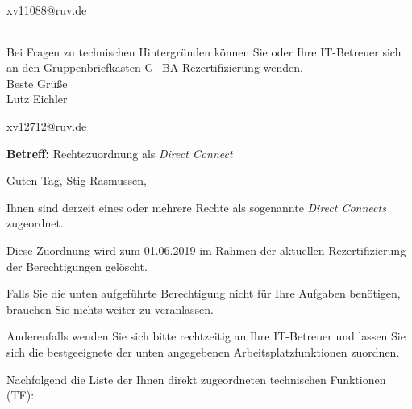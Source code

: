\documentclass[a4paper,landscape,12pt]{letter}
\begin{document}
\begin{letter}{xv11088@ruv.de\hfill \break}
\begin{tiny}
\begin{longtable}{|p{35mm}|p{15mm}|p{25mm}|p{10mm}|p{40mm}|p{50mm}|p{50mm}|}
\hline
		\end{longtable}
		\end{tiny}
	
\begin{minipage}{\textwidth}
			Bei Fragen zu technischen Hintergründen können Sie 
			oder Ihre IT-Betreuer sich an den Gruppenbriefkasten 
			G\_BA-Rezertifizierung
			wenden.\\
			\linebreak
			Beste Grüße\\
			Lutz Eichler
	\end{minipage}
	\end{letter}
	
\begin{letter}{xv12712@ruv.de\hfill \break}
\begin{normalsize}
	\opening{\textbf{Betreff:} Rechtezuordnung als \emph{Direct Connect}}
	\begin{normalsize} \hfill
	\end{normalsize}

	\begin{normalsize}
		Guten Tag, 
	Stig Rasmussen, \hfill \break
	\end{normalsize}
	\end{normalsize}
	
\begin{normalsize}
	Ihnen sind derzeit eines oder mehrere Rechte als sogenannte \emph{Direct Connects} zugeordnet.
	
	Diese Zuordnung wird zum 01.06.2019 im Rahmen der aktuellen Rezertifizierung der Berechtigungen gelöscht.
	
	Falls Sie die unten aufgeführte Berechtigung nicht für Ihre Aufgaben benötigen, 
	brauchen Sie nichts weiter zu veranlassen.
	
	Anderenfalls wenden Sie sich bitte rechtzeitig an Ihre IT-Betreuer 
	und lassen Sie sich die bestgeeignete der unten angegebenen Arbeitsplatzfunktionen zuordnen.
	\end{normalsize}
	
\begin{normalsize}
	Nachfolgend die Liste der Ihnen direkt zugeordneten technischen Funktionen (TF):


\end{normalsize}
\end{letter}
\end{document}
